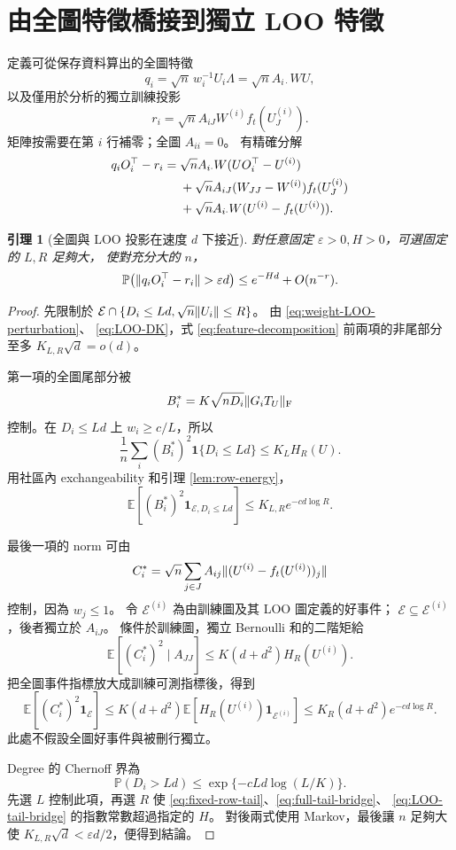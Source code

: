 \documentclass[11pt,a4paper]{article}
\theoremstyle{zhplain}
\newtheorem{lemma}[theorem]{引理}
\numberwithin{equation}{section}
\newcommand{\E}{\mathbb E}
\newcommand{\PP}{\mathbb P}
\newcommand{\one}{\mathbf 1}
\newcommand{\Frob}{\mathrm{F}}
\newcommand{\cE}{\mathcal E}
\DeclarePairedDelimiter{\norm}{\lVert}{\rVert}
\begin{document}
\section{由全圖特徵橋接到獨立 LOO 特徵}
\label{sec:bridge}
定義可從保存資料算出的全圖特徵
\[
 q_i=\sqrt n\,w_i^{-1}U_i\Lambda
     =\sqrt n A_{i\cdot}WU,
\]
以及僅用於分析的獨立訓練投影
\[
 r_i=\sqrt n A_{iJ}W^{(i)}f_t(U_J^{(i)}).
\]
矩陣按需要在第 \(i\) 行補零；全圖 \(A_{ii}=0\)。
有精確分解
\begin{align}
 q_iO_i^\top-r_i={}&
 \sqrt n A_{i\cdot}W(UO_i^\top-U^{(i)})\notag\\
 &+\sqrt n A_{iJ}(W_{JJ}-W^{(i)})f_t(U_J^{(i)})\notag\\
 &+\sqrt n A_{i\cdot}W(U^{(i)}-f_t(U^{(i)})).
 \label{eq:feature-decomposition}
\end{align}

\begin{lemma}[全圖與 LOO 投影在速度 \(d\) 下接近]
\label{lem:bridge}
對任意固定 \(\varepsilon>0,H>0\)，可選固定的 \(L,R\) 足夠大，
使對充分大的 \(n\)，
\begin{equation}
 \PP\!\left(\norm{q_iO_i^\top-r_i}>\varepsilon d\right)
 \le e^{-Hd}+O(n^{-r}).
 \label{eq:feature-bridge}
\end{equation}
\end{lemma}
\begin{proof}
先限制於
\(\cE\cap\{D_i\le Ld,\sqrt n\norm{U_i}\le R\}\)。
由 \eqref{eq:weight-LOO-perturbation}、
\eqref{eq:LOO-DK}，式 \eqref{eq:feature-decomposition}
前兩項的非尾部分至多 \(K_{L,R}\sqrt d=o(d)\)。

第一項的全圖尾部分被
\[
 B_i^*=K\sqrt{nD_i}\norm{G_iT_U}_{\Frob}
\]
控制。在 \(D_i\le Ld\) 上 \(w_i\ge c/L\)，所以
\[
 \frac1n\sum_i(B_i^*)^2\one\{D_i\le Ld\}
 \le K_L H_R(U).
\]
用社區內 exchangeability 和引理 \ref{lem:row-energy}，
\begin{equation}
 \E[(B_i^*)^2\one_{\cE,D_i\le Ld}]
 \le K_{L,R}e^{-cd\log R}.
 \label{eq:full-tail-bridge}
\end{equation}

最後一項的 norm 可由
\[
 C_i^*=\sqrt n\sum_{j\in J}A_{ij}
       \norm{(U^{(i)}-f_t(U^{(i)}))_j}
\]
控制，因為 \(w_j\le1\)。
令 \(\cE^{(i)}\) 為由訓練圖及其 LOO 圖定義的好事件；
\(\cE\subseteq\cE^{(i)}\)，後者獨立於 \(A_{iJ}\)。
條件於訓練圖，獨立 Bernoulli 和的二階矩給
\[
 \E[(C_i^*)^2\mid A_{JJ}]
 \le K(d+d^2)H_R(U^{(i)}).
\]
把全圖事件指標放大成訓練可測指標後，得到
\begin{equation}
 \E[(C_i^*)^2\one_{\cE}]
 \le K(d+d^2)
 \E[H_R(U^{(i)})\one_{\cE^{(i)}}]
 \le K_R(d+d^2)e^{-cd\log R}.
 \label{eq:LOO-tail-bridge}
\end{equation}
此處不假設全圖好事件與被刪行獨立。

Degree 的 Chernoff 界為
\[
 \PP(D_i>Ld)\le \exp\{-cLd\log(L/K)\}.
\]
先選 \(L\) 控制此項，再選 \(R\) 使
\eqref{eq:fixed-row-tail}、\eqref{eq:full-tail-bridge}、
\eqref{eq:LOO-tail-bridge} 的指數常數超過指定的 \(H\)。
對後兩式使用 Markov，最後讓 \(n\) 足夠大使
\(K_{L,R}\sqrt d<\varepsilon d/2\)，便得到結論。
\end{proof}
\end{document}
